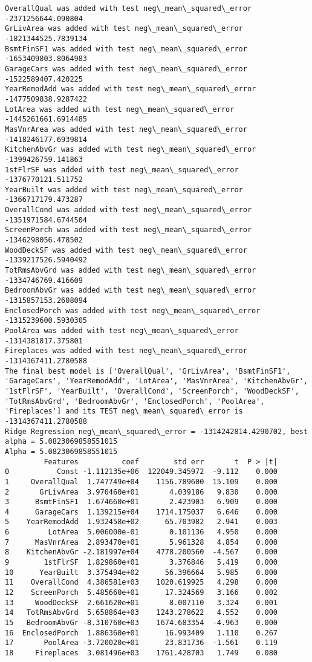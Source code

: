 \documentclass[11pt]{article}
\begin{document}
    \begin{Verbatim}[commandchars=\\\{\}]
OverallQual was added with test neg\_mean\_squared\_error -2371256644.090804
GrLivArea was added with test neg\_mean\_squared\_error -1821344525.7839134
BsmtFinSF1 was added with test neg\_mean\_squared\_error -1653409803.8064983
GarageCars was added with test neg\_mean\_squared\_error -1522589407.420225
YearRemodAdd was added with test neg\_mean\_squared\_error -1477509838.9287422
LotArea was added with test neg\_mean\_squared\_error -1445261661.6914485
MasVnrArea was added with test neg\_mean\_squared\_error -1418246177.6939814
KitchenAbvGr was added with test neg\_mean\_squared\_error -1399426759.141863
1stFlrSF was added with test neg\_mean\_squared\_error -1376770121.511752
YearBuilt was added with test neg\_mean\_squared\_error -1366717179.473287
OverallCond was added with test neg\_mean\_squared\_error -1351971584.6744504
ScreenPorch was added with test neg\_mean\_squared\_error -1346298056.478502
WoodDeckSF was added with test neg\_mean\_squared\_error -1339217526.5940492
TotRmsAbvGrd was added with test neg\_mean\_squared\_error -1334746769.416609
BedroomAbvGr was added with test neg\_mean\_squared\_error -1315857153.2608094
EnclosedPorch was added with test neg\_mean\_squared\_error -1315239600.5930305
PoolArea was added with test neg\_mean\_squared\_error -1314381817.375801
Fireplaces was added with test neg\_mean\_squared\_error -1314367411.2780588
The final best model is ['OverallQual', 'GrLivArea', 'BsmtFinSF1', 'GarageCars', 'YearRemodAdd', 'LotArea', 'MasVnrArea', 'KitchenAbvGr', '1stFlrSF', 'YearBuilt', 'OverallCond', 'ScreenPorch', 'WoodDeckSF', 'TotRmsAbvGrd', 'BedroomAbvGr', 'EnclosedPorch', 'PoolArea', 'Fireplaces'] and its TEST neg\_mean\_squared\_error is -1314367411.2780588
Ridge Regression neg\_mean\_squared\_error = -1314242814.4290702, best alpha = 5.0823069858551015
Alpha = 5.0823069858551015
         Features          coef        std err       t  P > |t|
0           Const -1.112135e+06  122049.345972  -9.112    0.000
1     OverallQual  1.747749e+04    1156.789600  15.109    0.000
2       GrLivArea  3.970460e+01       4.039186   9.830    0.000
3      BsmtFinSF1  1.674660e+01       2.423903   6.909    0.000
4      GarageCars  1.139215e+04    1714.175037   6.646    0.000
5    YearRemodAdd  1.932458e+02      65.703982   2.941    0.003
6         LotArea  5.006000e-01       0.101136   4.950    0.000
7      MasVnrArea  2.893470e+01       5.961328   4.854    0.000
8    KitchenAbvGr -2.181997e+04    4778.200560  -4.567    0.000
9        1stFlrSF  1.829860e+01       3.376846   5.419    0.000
10      YearBuilt  3.375494e+02      56.396664   5.985    0.000
11    OverallCond  4.386581e+03    1020.619925   4.298    0.000
12    ScreenPorch  5.485660e+01      17.324569   3.166    0.002
13     WoodDeckSF  2.661620e+01       8.007110   3.324    0.001
14   TotRmsAbvGrd  5.658864e+03    1243.278622   4.552    0.000
15   BedroomAbvGr -8.310760e+03    1674.683354  -4.963    0.000
16  EnclosedPorch  1.886360e+01      16.993409   1.110    0.267
17       PoolArea -3.720020e+01      23.831736  -1.561    0.119
18     Fireplaces  3.081496e+03    1761.428703   1.749    0.080

    \end{Verbatim}
\end{document}
